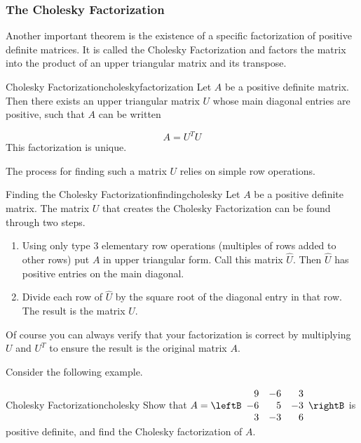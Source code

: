 \subsubsection{The Cholesky Factorization}

Another important theorem is the existence of a specific factorization of positive definite matrices. It is called the Cholesky Factorization and factors the matrix into the product of an upper triangular matrix and its transpose.

\begin{theorem}{Cholesky Factorization}{choleskyfactorization}
Let $A$ be a positive definite matrix. Then
there exists an upper triangular matrix $U$ whose main diagonal entries are positive, such that $A$ can be written

\begin{equation*}
A=
U^TU
\end{equation*}
This factorization is unique.
\end{theorem}

The process for finding such a matrix $U$ relies on simple row operations.

\begin{procedure}{Finding the Cholesky Factorization}{findingcholesky}
Let $A$ be a positive definite matrix. The matrix $U$ that creates the Cholesky Factorization can be found through two steps.
\begin{enumerate}
\item Using only type $3$ elementary row operations (multiples of rows added to other rows) put $A$ in upper triangular form. Call this matrix $\hat{U}$. Then $\hat{U}$ has positive entries on the main diagonal. 
\item Divide each row of $\hat{U}$ by the square root of the diagonal entry in that row. The result is the matrix $U$. 
\end{enumerate}
\end{procedure}

Of course you can always verify that your factorization is correct by multiplying $U$ and $U^T$ to ensure the result is the original matrix $A$. 

Consider the following example.

\begin{example}{Cholesky Factorization}{cholesky}
Show that
$A=\leftB\begin{array}{rrr}
9 & -6 & 3 \\ -6 & 5 & -3 \\ 3 & -3 & 6 
\end{array}\rightB$ 
is positive definite, and find the Cholesky factorization of $A$.
\end{example}

